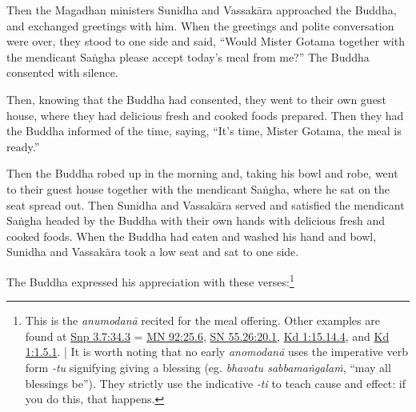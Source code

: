 \documentclass[12pt,openany]{book}%
\begin{document}
Then the Magadhan ministers Sunidha and \textsanskrit{Vassakāra} approached the Buddha, and exchanged greetings with him. When the greetings and polite conversation were over, they stood to one side and said, “Would Mister Gotama together with the mendicant \textsanskrit{Saṅgha} please accept today’s meal from me?” The Buddha consented with silence. 

Then, knowing that the Buddha had consented, they went to their own guest house, where they had delicious fresh and cooked foods prepared. Then they had the Buddha informed of the time, saying, “It’s time, Mister Gotama, the meal is ready.” 

Then the Buddha robed up in the morning and, taking his bowl and robe, went to their guest house together with the mendicant \textsanskrit{Saṅgha}, where he sat on the seat spread out. Then Sunidha and \textsanskrit{Vassakāra} served and satisfied the mendicant \textsanskrit{Saṅgha} headed by the Buddha with their own hands with delicious fresh and cooked foods. When the Buddha had eaten and washed his hand and bowl, Sunidha and \textsanskrit{Vassakāra} took a low seat and sat to one side. 

The Buddha expressed his appreciation with these verses:\footnote{This is the \textit{\textsanskrit{anumodanā}} recited for the meal offering. Other examples are found at \href{https://suttacentral.net/snp3.7/en/sujato\#34.3}{Snp 3.7:34.3} = \href{https://suttacentral.net/mn92/en/sujato\#25.6}{MN 92:25.6}, \href{https://suttacentral.net/sn55.26/en/sujato\#20.1}{SN 55.26:20.1}, \href{https://suttacentral.net/pli-tv-kd1/en/sujato\#15.14.4}{Kd 1:15.14.4}, and \href{https://suttacentral.net/pli-tv-kd1/en/sujato\#1.5.1}{Kd 1:1.5.1}. | It is worth noting that no early \textit{\textsanskrit{anomodanā}} uses the imperative verb form \textit{-tu} signifying giving a blessing (eg. \textit{bhavatu \textsanskrit{sabbamaṅgalaṁ}}, “may all blessings be”). They strictly use the indicative \textit{-ti} to teach cause and effect: if you do this, that happens. } 
\end{document}

